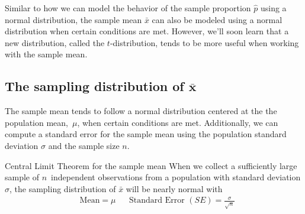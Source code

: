 \noindent%
Similar to how we can model the behavior of the
sample proportion $\hat{p}$ using a normal distribution,
the sample mean $\bar{x}$ can also be modeled using
a normal distribution when certain conditions are met.
However, we'll soon learn that a new distribution,
called the $t$-distribution,
tends to be more useful when working with the sample mean.
%


\subsection[The distribution of $\bar{x}$]
    {The sampling distribution of $\mathbf{\bar{x}}$}

The sample mean tends to follow
a normal distribution centered at the the population mean,~$\mu$,
when certain conditions are met.
Additionally, we can compute a standard error for the sample
mean using the population standard deviation $\sigma$
and the sample size $n$.

\begin{onebox}{Central Limit Theorem for the sample mean}
  When we collect a sufficiently large sample of
  $n$~independent observations from a population with
  standard deviation $\sigma$,
  the sampling distribution of $\bar{x}$ will be nearly
  normal with
  \begin{align*}
  &\text{Mean}=\mu
  &&\text{Standard Error }(SE) = \frac{\sigma}{\sqrt{n}}
  \end{align*}
\end{onebox}

